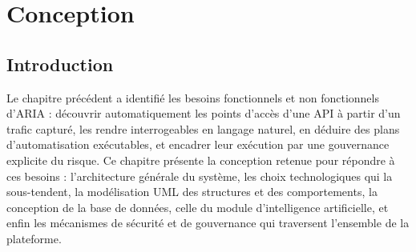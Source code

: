 
\chapter{Conception}

\section*{Introduction}
{}

Le chapitre précédent a identifié les besoins fonctionnels et non fonctionnels d'ARIA : découvrir automatiquement les points d'accès d'une API à partir d'un trafic capturé, les rendre interrogeables en langage naturel, en déduire des plans d'automatisation exécutables, et encadrer leur exécution par une gouvernance explicite du risque. Ce chapitre présente la conception retenue pour répondre à ces besoins : l'architecture générale du système, les choix technologiques qui la sous-tendent, la modélisation UML des structures et des comportements, la conception de la base de données, celle du module d'intelligence artificielle, et enfin les mécanismes de sécurité et de gouvernance qui traversent l'ensemble de la plateforme.


